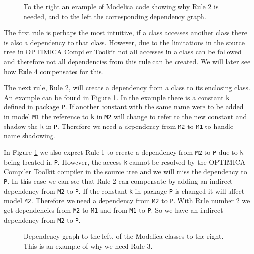\documentclass{cslthse-msc}
\begin{document}
\begin{figure}[!htbp]
    \centering
    \qquad
    \subfloat{\raisebox{3.2 cm}{}}
    \caption{To the right an example of Modelica code showing why Rule 2 is needed, and to the left the corresponding dependency graph.}
    \label{fig:parentGraph}
\end{figure}
The first rule is perhaps the most intuitive, if a class accesses another class there is also a dependency to that class. However, due to the limitations in the source tree in OPTIMICA Compiler Toolkit  not all accesses in a class can be followed and therefore not all dependencies from this rule can be created. We will later see how Rule 4 compensates for this. 

The next rule, Rule 2, will create a dependency from a class to its enclosing class. An example can be found in Figure \ref{fig:parentGraph}. In the example there is a constant \texttt{k} defined in package \texttt{P}. If another constant with the same name were to be added in model \texttt{M1} the reference to \texttt{k} in \texttt{M2} will change to refer to the new constant and shadow the \texttt{k} in \texttt{P}. Therefore we need a dependency from \texttt{M2} to \texttt{M1} to handle name shadowing.

In Figure \ref{fig:parentGraph} we also expect Rule 1 to create a dependency from \texttt{M2} to \texttt{P} due to \texttt{k} being located in \texttt{P}. However, the access \texttt{k} cannot be resolved by the OPTIMICA Compiler Toolkit compiler in the source tree and we will miss the dependency to \texttt{P}. In this case we can see that Rule 2 can compensate by adding an indirect dependency from \texttt{M2} to \texttt{P}. 
If the constant \texttt{k} in package \texttt{P} is changed it will affect model \texttt{M2}. Therefore we need a dependency from \texttt{M2} to \texttt{P}. With Rule number 2 we get dependencies from \texttt{M2} to \texttt{M1} and from \texttt{M1} to \texttt{P}. So we have an indirect dependency from \texttt{M2} to \texttt{P}.

\begin{figure}[!htbp]
    \centering
    \qquad
    \caption{Dependency graph to the left, of the Modelica classes to the right. This is an example of why we need Rule 3.}
    \label{fig:dotAccess}
\end{figure}
\end{document}
